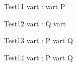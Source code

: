 
\begin{circus}
   \circprocess Test11 \circdef \circvres vart : \nat  \circspot  \lcirctime vart \rcirctime \circstartby P \\
\end{circus}

\begin{circus}
    \circprocess Test12 \circdef \circvres vart : \nat  \circspot  Q \circendby \lcirctime vart \rcirctime  \\
\end{circus}

\begin{circus}
    \circprocess Test13 \circdef \circvres vart : \nat  \circspot  P \circtimeout \lcirctime vart \rcirctime Q \\
\end{circus}

\begin{circus}
    \circprocess Test14 \circdef \circvres vart : \nat  \circspot  P \circtimedinterrupt \lcirctime vart \rcirctime Q \\
\end{circus}

